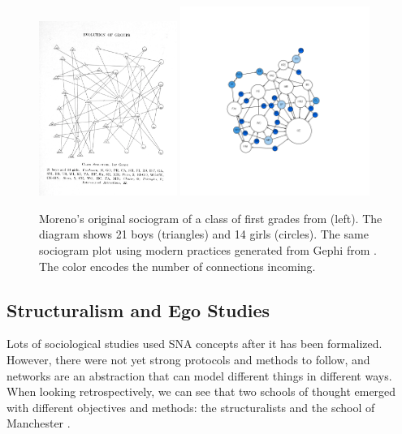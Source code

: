 \begin{figure}
    \centering %
    \includegraphics[width=0.4\textwidth]{static/figures/RelatedWork/Moreno-1}
    \includegraphics[width=0.55\textwidth]{static/figures/RelatedWork/Moreno-1_GrandJean}
    \caption{Moreno's original sociogram of a class of first grades from \cite{morenoWhoShallSurvive1934} (left). The diagram shows 21 boys (triangles) and 14 girls (circles). The same sociogram plot using modern practices generated from Gephi from \cite{grandjeanSocialNetworkAnalysis2015}. The color encodes the number of connections incoming.}
    \label{fig:moreno-sociogram}
\end{figure}



\subsection{Structuralism and Ego Studies}

Lots of sociological studies used SNA concepts after it has been formalized.
However, there were not yet strong protocols and methods to follow, and networks are an abstraction that can model different things in different ways.
When looking retrospectively, we can see that two schools of thought emerged with different objectives and methods: the structuralists and the school of Manchester \cite{eveDeuxTraditionsAnalyse2002, maurizio2000, freeman_development_2004}.

